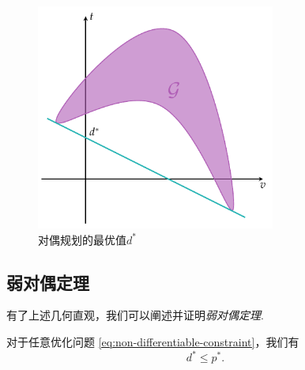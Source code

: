 \begin{figure}[htbp]
    \centering
    \includegraphics[width=0.7\textwidth]{figures/duality/duality-dual-d-star.pdf}
    \caption{对偶规划的最优值$d^*$}
    \label{fig:duality-dual-d-star}
\end{figure}

\subsection{弱对偶定理}

有了上述几何直观，我们可以阐述并证明\emph{弱对偶定理}.

\begin{theorem}[弱对偶定理]
    对于任意优化问题 \eqref{eq:non-differentiable-constraint}，我们有
    \[d^*\leq p^*.\]
\end{theorem}


